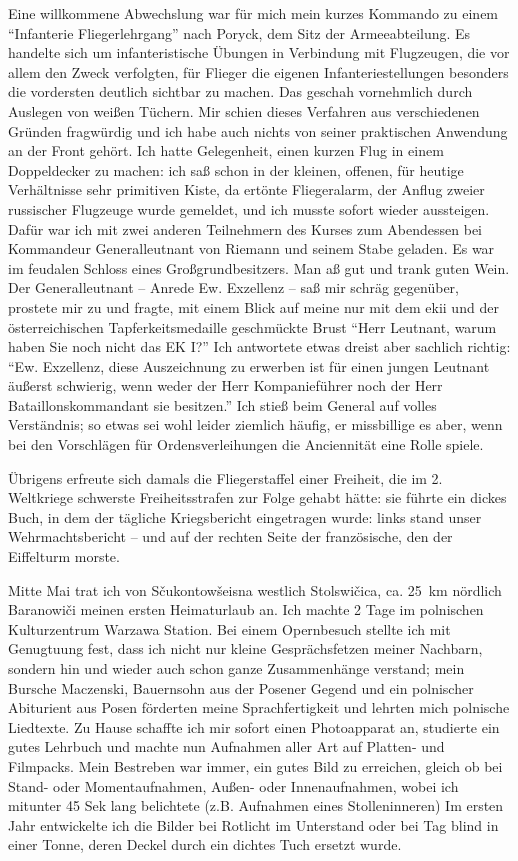 \documentclass[a5paper,pagesize,10pt,twoside=true]{scrbook}
\begin{document}
Eine willkommene Abwechslung war für mich mein kurzes Kommando zu einem \enquote{Infanterie Fliegerlehrgang} nach Poryck, dem Sitz der Armeeabteilung. Es handelte sich um infanteristische Übungen in Verbindung mit Flugzeugen, die vor allem den Zweck verfolgten, für Flieger die eigenen Infanteriestellungen besonders die vordersten deutlich sichtbar zu machen. Das geschah vornehmlich durch Auslegen von weißen Tüchern. Mir schien dieses Verfahren aus verschiedenen Gründen fragwürdig und ich habe auch nichts von seiner praktischen Anwendung an der Front gehört. Ich hatte Gelegenheit, einen kurzen Flug in einem Doppeldecker zu machen: ich saß schon in der kleinen, offenen, für heutige Verhältnisse sehr primitiven Kiste, da ertönte Fliegeralarm, der Anflug zweier russischer Flugzeuge wurde gemeldet, und ich musste sofort wieder aussteigen. Dafür war ich mit zwei anderen Teilnehmern des Kurses zum Abendessen bei Kommandeur Generalleutnant von Riemann und seinem Stabe geladen. Es war im feudalen Schloss eines Großgrundbesitzers. Man aß gut und trank guten Wein. Der Generalleutnant -- Anrede Ew. Exzellenz -- saß mir schräg gegenüber, prostete mir zu und fragte, mit einem Blick auf meine nur mit dem \ac{ekii} und der österreichischen Tapferkeitsmedaille geschmückte Brust \enquote{Herr Leutnant, warum haben Sie noch nicht das EK I?} Ich antwortete etwas dreist aber sachlich richtig: \enquote{Ew. Exzellenz, diese Auszeichnung zu erwerben ist für einen jungen Leutnant äußerst schwierig, wenn weder der Herr Kompanieführer noch der Herr Bataillonskommandant sie besitzen.} Ich stieß beim General auf volles Verständnis; so etwas sei wohl leider ziemlich häufig, er missbillige es aber, wenn bei den Vorschlägen für Ordensverleihungen die Anciennität eine Rolle spiele.

Übrigens erfreute sich damals die Fliegerstaffel einer Freiheit, die im 2. Weltkriege schwerste Freiheitsstrafen zur Folge gehabt hätte: sie führte ein dickes Buch, in dem der tägliche Kriegsbericht eingetragen wurde: links stand unser Wehrmachtsbericht -- und auf der rechten Seite der französische, den der Eiffelturm morste.

Mitte Mai trat ich von Sčukontowšeisna westlich Stolswičica, ca. 25~km nördlich Baranowiči meinen ersten Heimaturlaub an. Ich machte 2 Tage im polnischen Kulturzentrum Warzawa Station. Bei einem Opernbesuch stellte ich mit Genugtuung fest, dass ich nicht nur kleine Gesprächsfetzen meiner Nachbarn, sondern hin und wieder auch schon ganze Zusammenhänge verstand; mein Bursche Maczenski, Bauernsohn aus der Posener Gegend und ein polnischer Abiturient aus Posen förderten meine Sprachfertigkeit und lehrten mich polnische Liedtexte. Zu Hause schaffte ich mir sofort einen Photoapparat an, studierte ein gutes Lehrbuch und machte nun Aufnahmen aller Art auf Platten- und Filmpacks. Mein Bestreben war immer, ein gutes Bild zu erreichen, gleich ob bei Stand- oder Momentaufnahmen, Außen- oder Innenaufnahmen, wobei ich mitunter 45 Sek lang belichtete (z.B. Aufnahmen eines Stolleninneren) Im ersten Jahr entwickelte ich die Bilder bei Rotlicht im Unterstand oder bei Tag blind in einer Tonne, deren Deckel durch ein dichtes Tuch ersetzt wurde.
\end{document}
